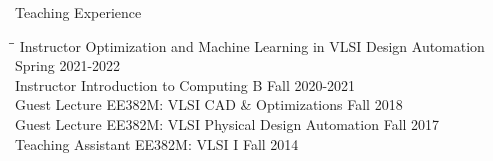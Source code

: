 \begin{rSection}{Teaching Experience}

\begin{tabbing}
\hspace{1.3in}\= \hspace{4.4in}\= \kill
Instructor \> Optimization and Machine Learning in VLSI Design Automation \> Spring 2021-2022 \\
Instructor \> Introduction to Computing B \> Fall 2020-2021 \\
Guest Lecture \> EE382M: VLSI CAD \& Optimizations \> Fall 2018 \\
Guest Lecture \> EE382M: VLSI Physical Design Automation \> Fall 2017 \\
Teaching Assistant \> EE382M: VLSI I \> Fall 2014 
\end{tabbing}

\end{rSection}
